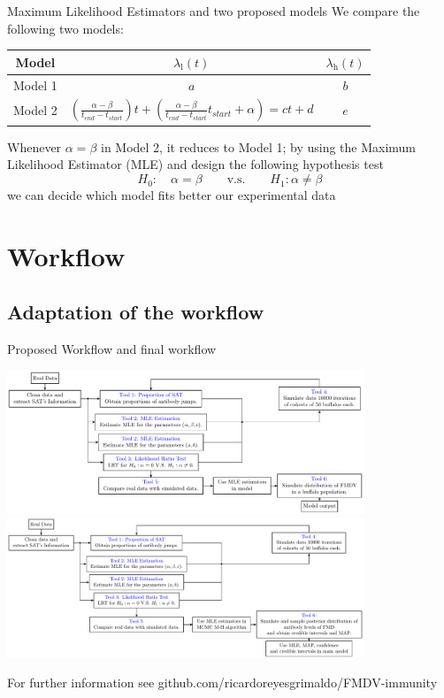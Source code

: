 \documentclass[10pt]{beamer}
\newcommand{\bes}{\begin{equation*}}
\newcommand{\ees}{\end{equation*}}
\newcommand{\rl}{\mathrm{l}}
\newcommand{\rh}{\mathrm{h}}
\theoremstyle{plain}
\theoremstyle{definition}
\theoremstyle{remark}
\begin{document}
\begin{frame}{Maximum Likelihood Estimators and two proposed models}
We compare the following two models:
\begin{center}\begin{tabular}{c||cc} 
Model&$\lambda_\rl(t)$&$\lambda_\rh(t)$\\\hline\hline
Model 1&$a$&$b$\\
Model 2&$\displaystyle\left(\frac{\alpha-\beta}{t_{end}-t_{start}}\right)t+\left(
\frac{\alpha-\beta}{t_{end}-t_{start}}t_{start}+\alpha\right)=
ct+d$&$e$\end{tabular}\end{center}
Whenever $\alpha=\beta$ in Model 2, it reduces to Model 1; by using the Maximum Likelihood 
Estimator (MLE) and design the following hypothesis test
\bes
H_0:\quad\alpha=\beta\qquad\mbox{v.s.}\qquad H_1:\alpha\neq\beta
\ees
we can decide which model fits better our experimental data
\end{frame}

\section{Workflow}
\subsection{Adaptation of the workflow}
\begin{frame}{Proposed Workflow and final workflow}
\begin{center}
\includegraphics[height=0.3\textheight,width=0.8\textwidth]{Workflow_diagram.pdf}
\includegraphics[height=0.3\textheight,width=0.8\textwidth]{Workflow_diagram2.pdf}
\end{center}
For further information see {\color[rgb]{0,0,1} github.com/ricardoreyesgrimaldo/FMDV-immunity}
\end{frame}
\end{document}
